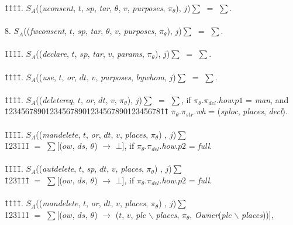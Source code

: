 \documentclass[a4paper]{article}
\begin{document}
\begin{tabbing}
\=1\=1\=1\=1\= .	$S_A$((\textit{uconsent}, $t$, $sp$, \textit{tar}, $\theta$, $v$, \textit{purposes}, $\pi_{\theta}$), $j$)$\sum$ $=$ $\sum$.\\\\
8.	$S_A$((\textit{fwconsent}, $t$, $sp$, \textit{tar}, $\theta$, $v$, \textit{purposes}, $\pi_{\theta}$), $j$)$\sum$ $=$ $\sum$.\\\\
\=1\=1\=1\=1\= .	$S_A$((\textit{declare}, $t$, $sp$, \textit{tar},  $v$, \textit{params}, $\pi_{\theta}$), $j$)$\sum$ $=$ $\sum$.\\\\
\=1\=1\=1\=1\= .	$S_A$((\textit{use}, $t$, \textit{or}, $dt$, $v$, \textit{purposes}, \textit{bywhom}, $j$)$\sum$ $=$ $\sum$.\\\\	
\=1\=1\=1\=1\= .	$S_A$((\textit{deletereq}, $t$, \textit{or}, $dt$, $v$, $\pi_{\theta}$), $j$)$\sum$ $=$ $\sum$, if  $\pi_{\theta}$.$\pi_{del}$.\textit{how}.$p1$ =  \textit{man}, and\\
	\=12345678901234567890123456789012345678\=1\=1\= \kill
		\>\> 
	 $\pi_{\theta}$.$\pi_{str}$.\textit{wh} =  (\textit{sploc}, \textit{places}, \textit{decl}).\\\\
\=1\=1\=1\=1\= .	$S_A$((\textit{mandelete}, $t$, \textit{or}, $dt$, $v$,  \textit{places}, $\pi_{\theta}$) , $j$)$\sum$  
		\\ 
		\=123\=1\=1\=1\= \kill
		\>\> $=$ $\sum$[($ow$, $ds$, $\theta$) $\rightarrow$ $\bot$], if  $\pi_{\theta}$.$\pi_{del}$.\textit{how}.$p2$ =  \textit{full}.  \\\\	
\=1\=1\=1\=1\= .	$S_A$((\textit{autdelete}, $t$, \textit{sp}, $dt$, $v$,  \textit{places}, $\pi_{\theta}$) , $j$)$\sum$ \\ 
		\=123\=1\=1\=1\= \kill
		\>\>$=$ 
		$\sum$[($ow$, $ds$, $\theta$) $\rightarrow$ $\bot$], if  $\pi_{\theta}$.$\pi_{del}$.\textit{how}.$p2$ =  \textit{full}. \\\\
\=1\=1\=1\=1\= .	$S_A$((\textit{mandelete}, $t$, \textit{or}, $dt$, $v$,  \textit{places}, $\pi_{\theta}$) , $j$)$\sum$  
		\\ 
		\=123\=1\=1\=1\= \kill
		\>\> $=$ $\sum$[($ow$, $ds$, $\theta$) $\rightarrow$ ($t$, $v$, \textit{plc} $\backslash$ \textit{places}, $\pi_{\theta}$, \textit{Owner}(\textit{plc} $\backslash$ \textit{places}))], \\ 

\end{tabbing}
\end{document}
